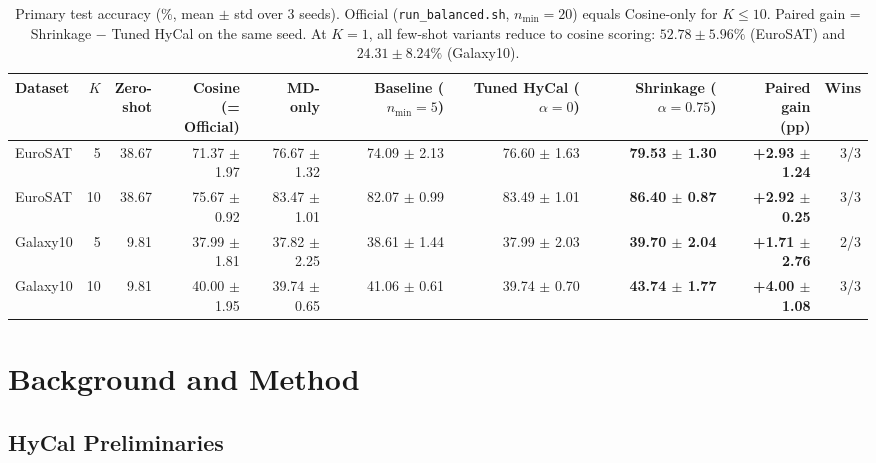 \documentclass[letterpaper]{article} %
\newcommand{\nmin}{n_{\min}}
\begin{document}
\begin{table}[t]
\centering
\footnotesize
\setlength{\tabcolsep}{4pt}
\begin{tabular}{@{}lrrrrrrrrr@{}}
\toprule
Dataset & $K$ & \shortstack{Zero-\\shot} & \shortstack{Cosine\\(= Official)} & \shortstack{MD-\\only} & \shortstack{Baseline\\($\nmin{=}5$)} & \shortstack{Tuned HyCal\\($\alpha{=}0$)} & \shortstack{Shrinkage\\($\alpha{=}0.75$)} & \shortstack{Paired gain\\(pp)} & Wins \\
\midrule
EuroSAT & 5 & 38.67 & 71.37 $\pm$ 1.97 & 76.67 $\pm$ 1.32 & 74.09 $\pm$ 2.13 & 76.60 $\pm$ 1.63 & \textbf{79.53 $\pm$ 1.30} & \textbf{+2.93 $\pm$ 1.24} & 3/3 \\
EuroSAT & 10 & 38.67 & 75.67 $\pm$ 0.92 & 83.47 $\pm$ 1.01 & 82.07 $\pm$ 0.99 & 83.49 $\pm$ 1.01 & \textbf{86.40 $\pm$ 0.87} & \textbf{+2.92 $\pm$ 0.25} & 3/3 \\
Galaxy10 & 5 & 9.81 & 37.99 $\pm$ 1.81 & 37.82 $\pm$ 2.25 & 38.61 $\pm$ 1.44 & 37.99 $\pm$ 2.03 & \textbf{39.70 $\pm$ 2.04} & \textbf{+1.71 $\pm$ 2.76} & 2/3 \\
Galaxy10 & 10 & 9.81 & 40.00 $\pm$ 1.95 & 39.74 $\pm$ 0.65 & 41.06 $\pm$ 0.61 & 39.74 $\pm$ 0.70 & \textbf{43.74 $\pm$ 1.77} & \textbf{+4.00 $\pm$ 1.08} & 3/3 \\
\bottomrule
\end{tabular}
\caption{Primary test accuracy (\%, mean $\pm$ std over 3 seeds). Official (\texttt{run\_balanced.sh}, $\nmin=20$) equals Cosine-only for $K \le 10$. Paired gain = Shrinkage $-$ Tuned HyCal on the same seed. At $K = 1$, all few-shot variants reduce to cosine scoring: $52.78 \pm 5.96\%$ (EuroSAT) and $24.31 \pm 8.24\%$ (Galaxy10).}
\label{tab:main}
\end{table}

\section{Background and Method}

\subsection{HyCal Preliminaries}
\end{document}
